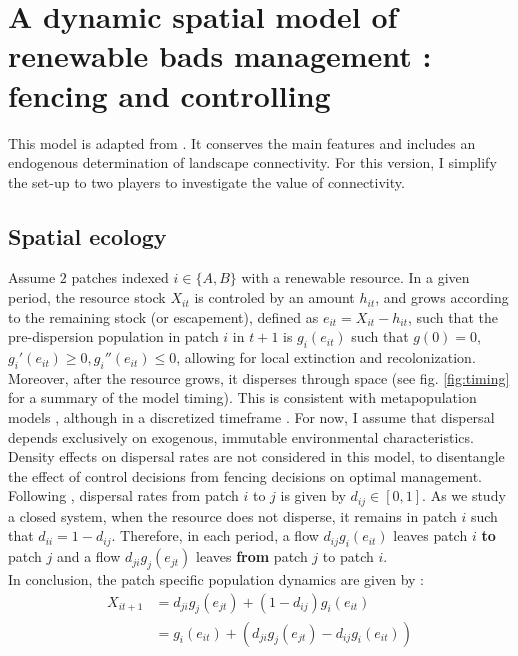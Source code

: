 
\section{A dynamic spatial model of renewable bads management : fencing and controlling}
\label{sec:model}

This model is adapted from \cite{costello_private_2017}. It conserves the main features and includes an endogenous determination of landscape connectivity. For this version, I simplify the set-up to two players to investigate the value of connectivity.  

\subsection{Spatial ecology}
Assume $2$ patches indexed $i\in \{A, B\}$ with a renewable resource. In a given period, the resource stock $X_{it}$ is controled by an amount $h_{it}$, and grows according to the remaining stock (or escapement), defined as $e_{it} = X_{it} - h_{it}$, such that the pre-dispersion population in patch $i$ in $t+1$ is $g_i(e_{it})$ such that $g(0)=0$, $g_i'(e_{it})\geq0, g_i''(e_{it}) \leq 0$, allowing for local extinction and recolonization. Moreover, after the resource grows, it disperses through space (see fig. \ref{fig:timing} for a summary of the model timing). This is consistent with metapopulation models \citep{sanchirico_bioeconomics_1999, bulte_metapopulation_1999}, although in a discretized timeframe \citep{costello_private_2017}. For now, I  assume that dispersal depends exclusively on exogenous, immutable environmental characteristics. Density effects on dispersal rates are not considered in this model, to disentangle the effect of control decisions from fencing decisions on optimal management. Following \cite{costello_private_2017}, dispersal rates from patch $i$ to $j$ is given by $d_{ij} \in [0,1]$. As we study a closed system, when the resource does not disperse, it remains in patch $i$ such that $d_{ii} = 1 - d_{ij}$. Therefore, in each period, a flow $d_{ij}g_i(e_{it})$ leaves patch $i$ \textbf{to} patch $j$ and a flow $d_{ji}g_j(e_{jt})$ leaves \textbf{from} patch $j$ to patch $i$. \\
In conclusion, the patch specific population dynamics are given by : 
\begin{align}
X_{it+1} &=  d_{ji} g_j(e_{jt}) + \left(1 - d_{ij}\right)g_i(e_{it}) \nonumber \\
& = g_i(e_{it}) + \left( d_{ji} g_j(e_{jt}) - d_{ij} g_i(e_{it}) \right)
\end{align}

